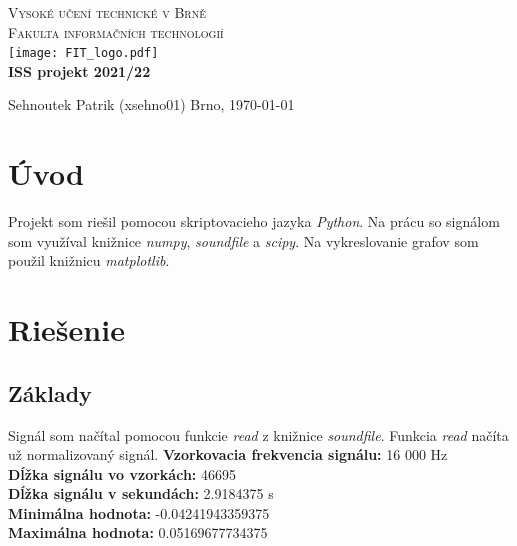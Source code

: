 \documentclass[a4paper,oneside]{article}
\begin{document}
    \begin{titlepage}
        \begin{center}
            \Huge \textsc{Vysoké učení technické v Brně}\\
            \huge \textsc{Fakulta informačních technologií}\\  
            {\texttt{[image: FIT\_logo.pdf]}} \\
            \huge \bfseries ISS projekt 2021/22\\
        \end{center}
    
        {\large Sehnoutek Patrik (xsehno01) \hfill Brno, \today   \\}
    \end{titlepage}
    
    \tableofcontents
    \thispagestyle{empty}
    \newpage
    
    \setcounter{page}{3}

    \section{Úvod}
    Projekt som riešil pomocou skriptovacieho jazyka \textit{Python}. Na prácu so signálom som využíval knižnice \textit{numpy}, \textit{soundfile} a \textit{scipy}. Na vykreslovanie grafov som použil knižnicu \textit{matplotlib}.
    
    \section{Riešenie}
    
    \subsection{Základy}
    
    Signál som načítal pomocou funkcie \textit{read} z knižnice \textit{soundfile}. Funkcia \textit{read} načíta už normalizovaný signál.
    \newline \newline
    \textbf{Vzorkovacia frekvencia signálu:} 16 000 Hz \\
    \textbf{Dĺžka signálu vo vzorkách:} 46695 \\
    \textbf{Dĺžka signálu v sekundách:} 2.9184375 s \\
    \textbf{Minimálna hodnota:} -0.04241943359375 \\
    \textbf{Maximálna hodnota:} 0.05169677734375 \\
    
\end{document}
